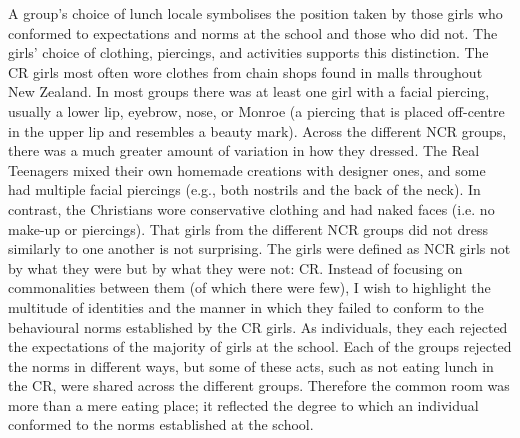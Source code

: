 A group's choice of lunch locale symbolises the position taken by those girls who conformed to expectations and norms at the school and those who did not.  The girls' choice of clothing, piercings, and activities supports this distinction.  The CR girls most often wore clothes from chain shops found in malls throughout New Zealand.  In most groups there was at least one girl with a facial piercing, usually a lower lip, eyebrow, nose, or Monroe (a piercing that is placed off-centre in the upper lip and resembles a beauty mark).  Across the different NCR groups, there was a much greater amount of variation in how they dressed.  The Real Teenagers mixed their own homemade creations with designer ones, and some had multiple facial piercings (e.g., both nostrils and the back of the neck).  In contrast, the Christians wore conservative clothing and had naked faces (i.e. no make-up or piercings).  That girls from the different NCR groups did not dress similarly to one another is not surprising.  The girls were defined as NCR girls not by what they were but by what they were not: CR.  Instead of focusing on commonalities between them (of which there were few), I wish to highlight the multitude of identities and the manner in which they failed to conform to the behavioural norms established by the CR girls.  As individuals, they each rejected the expectations of the majority of girls at the school.  Each of the groups rejected the norms in different ways, but some of these acts, such as not eating lunch in the CR, were shared across the different groups.  Therefore the common room was more than a mere eating place; it reflected the degree to which an individual conformed to the norms established at the school.



